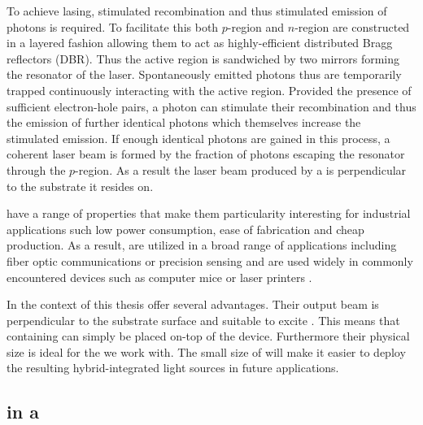 		To achieve lasing, stimulated recombination and thus stimulated emission of photons is required. To facilitate this both $p$-region and $n$-region are constructed in a layered fashion allowing them to act as highly-efficient distributed Bragg reflectors (DBR). Thus the active region is sandwiched by two mirrors forming the resonator of the laser. Spontaneously emitted photons thus are temporarily trapped continuously interacting with the active region. Provided the presence of sufficient electron-hole pairs, a photon can stimulate their recombination and thus the emission of further identical photons which themselves increase the stimulated emission. If enough identical photons are gained in this process, a coherent laser beam is formed by the fraction of photons escaping the resonator through the $p$-region. As a result the laser beam produced by a \VCSEL is perpendicular to the substrate it resides on.

		\VCSELs have a range of properties that make them particularity interesting for industrial applications such low power consumption, ease of fabrication and cheap production. As a result, \VCSELs are utilized in a broad range of applications including fiber optic communications or precision sensing and are used widely in commonly encountered devices such as computer mice or laser printers \cite{Weidenfeld}.

		In the context of this thesis \VCSELs offer several advantages. Their output beam is perpendicular to the substrate surface and suitable to excite \sivs. This means that \nds containing \sivs can simply be placed on-top of the device. Furthermore their physical size is ideal for the \nds we work with. The small size of \VCSELs will make it easier to deploy the resulting hybrid-integrated light sources in future applications.

	\subsection{\SIV in a \Vcsel}

